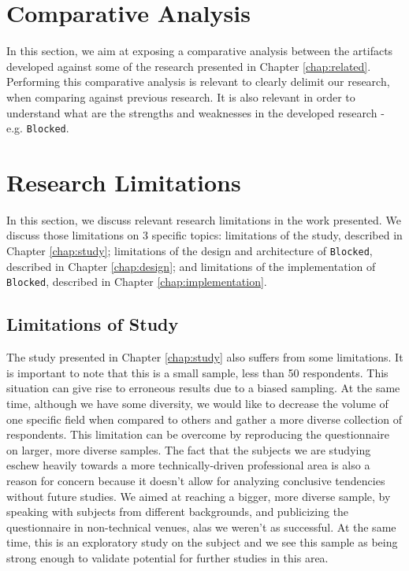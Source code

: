 \section{Comparative Analysis}

In this section, we aim at exposing a comparative analysis between the artifacts developed against some of the research presented in Chapter \ref{chap:related}. Performing this comparative analysis is relevant to clearly delimit our research, when comparing against previous research. It is also relevant in order to understand what are the strengths and weaknesses in the developed research - e.g. \texttt{Blocked}.



\section{Research Limitations}
\label{sec:eval-limitations}
In this section, we discuss relevant research limitations in the work presented. We discuss those limitations on 3 specific topics: limitations of the study, described in Chapter \ref{chap:study}; limitations of the design and architecture of \texttt{Blocked}, described in Chapter \ref{chap:design}; and limitations of the implementation of \texttt{Blocked}, described in Chapter \ref{chap:implementation}.

\subsection{Limitations of Study}

The study presented in Chapter \ref{chap:study} also suffers from some limitations. It is important to note that this is a small sample, less than 50 respondents. This situation can give rise to erroneous results due to a biased sampling. At the same time, although we have some diversity, we would like to decrease the volume of one specific field when compared to others and gather a more diverse collection of respondents. This limitation can be overcome by reproducing the questionnaire on larger, more diverse samples. The fact that the subjects we are studying eschew heavily towards a more technically-driven professional area is also a reason for concern because it doesn't allow for analyzing conclusive tendencies without future studies. We aimed at reaching a bigger, more diverse sample, by speaking with subjects from different backgrounds, and publicizing the questionnaire in non-technical venues, alas we weren't as successful. At the same time, this is an exploratory study on the subject and we see this sample as being strong enough to validate potential for further studies in this area.

